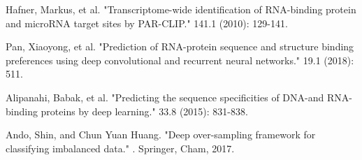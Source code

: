\documentclass[twoside,twocolumn]{article}
\begin{document}
\begin{thebibliography}{99} %

Hafner, Markus, et al. "Transcriptome-wide identification of RNA-binding protein and microRNA target sites by PAR-CLIP."  141.1 (2010): 129-141.

Pan, Xiaoyong, et al. "Prediction of RNA-protein sequence and structure binding preferences using deep convolutional and recurrent neural networks."  19.1 (2018): 511.

Alipanahi, Babak, et al. "Predicting the sequence specificities of DNA-and RNA-binding proteins by deep learning."  33.8 (2015): 831-838.

Ando, Shin, and Chun Yuan Huang. "Deep over-sampling framework for classifying imbalanced data." . Springer, Cham, 2017.

\end{thebibliography}

\end{document}
